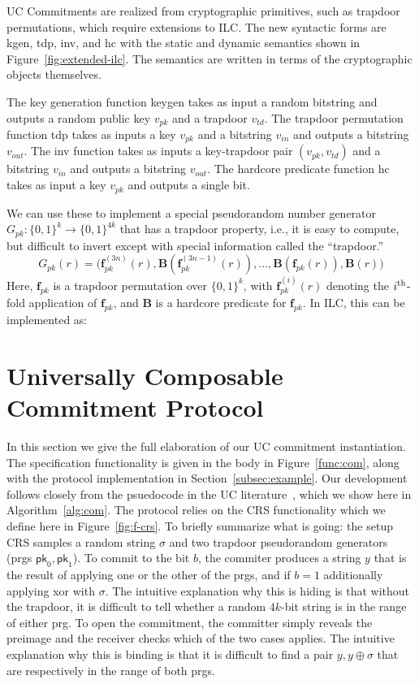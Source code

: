 UC Commitments are realized from cryptographic primitives, such as trapdoor
permutations, which require extensions to ILC. The new syntactic forms are
\textsf{kgen}, \textsf{tdp}, \textsf{inv}, and \textsf{hc} with the static and
dynamic semantics shown in Figure~\ref{fig:extended-ilc}. The semantics are
written in terms of the cryptographic objects themselves.

The key generation function \textsf{keygen} takes as input a random bitstring
and outputs a random public key $v_{pk}$ and a trapdoor $v_{td}$. The trapdoor
permutation function
\textsf{tdp} takes as inputs a key $v_{pk}$ and a bitstring $v_{in}$ and outputs
a bitstring $v_{out}$. The \textsf{inv} function takes as inputs a key-trapdoor
pair $(v_{pk}, v_{td})$ and a bitstring $v_{in}$ and outputs a bitstring
$v_{out}$. The hardcore predicate function
\textsf{hc} takes as input a key $v_{pk}$ and outputs a single bit.



We can use these to implement a special pseudorandom number generator $G_{pk}
\colon \{0,1\}^k \to \{0,1\}^{4k}$ that has a trapdoor property, i.e., it is easy
to compute, but difficult to invert except with special information called the
``trapdoor.''
\[ G_{pk}(r) = \big(\mathbf{f}_{pk}^{(3n)}(r),
\mathbf{B}(\mathbf{f}_{pk}^{(3n-1)}(r)), \ldots, \mathbf{B}(\mathbf{f}_{pk}(r)),
\mathbf{B}(r)\big)\]
\noindent Here, $\mathbf{f}_{pk}$ is a trapdoor permutation over $\{0,1\}^{k}$,
with $\mathbf{f}_{pk}^{(i)}(r)$ denoting the $i^{\textnormal{th}}$-fold
application of $\mathbf{f}_{pk}$, and $\mathbf{B}$ is a hardcore predicate for
$\mathbf{f}_{pk}$. In ILC, this can be implemented as:


\section{Universally Composable Commitment Protocol}
\label{app:ucc}
In this section we give the full elaboration of our UC commitment instantiation.
The specification functionality is given in the body in Figure~\ref{func:com},
along with the protocol implementation in Section~\ref{subsec:example}.
Our development follows closely from the psuedocode in the UC literature~\cite{canetti2001commitments}, which we show here in Algorithm~\ref{alg:com}.
The protocol relies on the CRS functionality which we define here in Figure~\ref{fig:f-crs}.
To briefly summarize what is going: the setup CRS samples a random string $\sigma$ and two trapdoor pseudorandom generators (prgs $\mathsf{pk}_0, \mathsf{pk}_1$).
To commit to the bit $b$, the commiter produces a string $y$ that is the result of applying one or the other of the prgs, and if $b=1$ additionally applying xor with $\sigma$.
The intuitive explanation why this is hiding is that without the trapdoor, it is difficult to tell whether a random $4k$-bit string is in the range of either prg. To open the commitment, the committer simply reveals the preimage and the receiver checks which of the two cases applies. The intuitive explanation why this is binding is that it is difficult to find a pair $y,y\oplus\sigma$ that are respectively in the range of both prgs.

